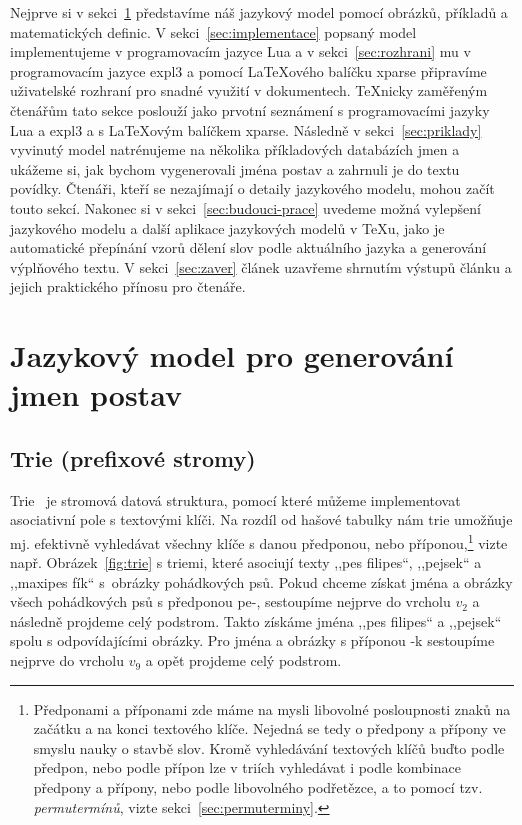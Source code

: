 \documentclass{csbulletin}
\newcommand\vref[1]{\ref{#1} na straně~\pageref{#1}}
\let\vref=\ref
\begin{document}
Nejprve si v sekci~\ref{sec:definice} představíme náš jazykový model pomocí obrázků, příkladů a matematických definic. V sekci~\vref{sec:implementace} popsaný model implementujeme v programovacím jazyce Lua a v sekci~\vref{sec:rozhrani} mu v programovacím jazyce expl3 a pomocí \LaTeX ového balíčku xparse připravíme uživatelské rozhraní pro snadné využití v dokumentech. \TeX nicky zaměřeným čtenářům tato sekce poslouží jako prvotní seznámení s programovacími jazyky Lua a expl3 a s \LaTeX ovým balíčkem xparse. Následně v sekci~\vref{sec:priklady} vyvinutý model natrénujeme na několika příkladových databázích jmen a ukážeme si, jak bychom vygenerovali jména postav a zahrnuli je do textu povídky. Čtenáři, kteří se nezajímají o detaily jazykového modelu, mohou začít touto sekcí. Nakonec si v sekci~\vref{sec:budouci-prace} uvedeme možná vylepšení jazykového modelu a další aplikace jazykových modelů v \TeX u, jako je automatické přepínání vzorů dělení slov podle aktuálního jazyka a generování výplňového textu. V sekci~\vref{sec:zaver} článek uzavřeme shrnutím výstupů článku a jejich praktického přínosu pro čtenáře.

\section{Jazykový model pro generování jmen postav}
\label{sec:definice}
\subsection{Trie (prefixové stromy)}
Trie~\cite{knuth1997digital} je stromová datová struktura, pomocí které můžeme implementovat asociativní pole s textovými klíči. Na rozdíl od hašové tabulky nám trie umožňuje mj. efektivně vyhledávat všechny klíče s danou předponou, nebo příponou,\footnote{Předponami a příponami zde máme na mysli libovolné posloupnosti znaků na začátku a na konci textového klíče. Nejedná se tedy o předpony a přípony ve smyslu nauky o stavbě slov. Kromě vyhledávání textových klíčů buďto podle předpon, nebo podle přípon lze v triích vyhledávat i podle kombinace předpony a přípony, nebo podle libovolného podřetězce, a to pomocí tzv. \emph{permutermínů}, vizte sekci~\vref{sec:permuterminy}.} vizte např. Obrázek~\ref{fig:trie} s triemi, které asociují texty ,,pes filipes``, ,,pejsek`` a ,,maxipes fík`` s~obrázky pohádkových psů. Pokud chceme získat jména a obrázky všech pohádkových psů s předponou pe-, sestoupíme nejprve do vrcholu $v_2$ a následně projdeme celý podstrom. Takto získáme jména ,,pes filipes`` a ,,pejsek`` spolu s odpovídajícími obrázky. Pro jména a obrázky s příponou -k sestoupíme nejprve do vrcholu $v_9$ a opět projdeme celý podstrom.
\end{document}

